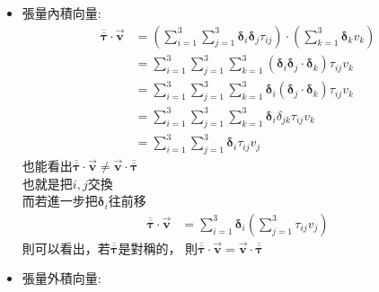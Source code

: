 \documentclass[../main.tex]{subfiles}
\begin{document}
\begin{itemize}
\begin{itemize}
\begin{align}
          \right)\sigma_{ij}\tau_{mn} \nonumber\\
          &= \sum_{i=1}^3 \sum_{j=1}^3 \sum_{m=1}^3 \sum_{n=1}^3 \delta_{jm}\delta_{in} \sigma_{ij}\tau_{mn} \nonumber\\
          &= \sum_{i=1}^3 \sum_{j=1}^3 \sigma_{ij}\tau_{ji}
        \end{align}
        P.S. 如果有一個是張量$\overline{\overline {\bm \tau}}$，另一個是兩個向量直積產生的張量$\vec {\bm v} \vec {\bm w}$，則
        \begin{equation}
          \overline{\overline {\bm \tau}} : \left(\vec {\bm v} \vec {\bm w}\right) = \sum_{i=1}^3 \sum_{j=1}^3 \tau_{ij} v_j w_i
        \end{equation}
      \item 張量內積向量:
        \begin{align}
          \overline{\overline {\bm \tau}} \cdot \vec {\bm v} &=
          \left(
            \sum_{i=1}^3 \sum_{j=1}^3 \bm \delta_i \bm \delta_j \tau_{ij}
          \right) \cdot
          \left(
            \sum_{k=1}^3 \bm \delta_k v_k
          \right) \nonumber\\
          &= \sum_{i=1}^3 \sum_{j=1}^3 \sum_{k=1}^3 \left(
            \bm \delta_i \bm \delta_j \cdot \bm \delta_k
          \right) \tau_{ij} v_k \nonumber\\
          &= \sum_{i=1}^3 \sum_{j=1}^3 \sum_{k=1}^3 \bm \delta_i (\bm \delta_j \cdot \bm \delta_k)  \tau_{ij} v_k \nonumber\\
          &= \sum_{i=1}^3 \sum_{j=1}^3 \sum_{k=1}^3 \bm \delta_i \delta_{jk}  \tau_{ij} v_k \nonumber\\
          &= \sum_{i=1}^3 \sum_{j=1}^3  \bm \delta_i  \tau_{ij} v_j 
        \end{align}
        也能看出$\overline{\overline {\bm \tau}} \cdot \vec {\bm v} \neq \vec {\bm v} \cdot \overline{\overline {\bm \tau}}$\\
        也就是把$i,j$交換\\
        而若進一步把$\bm\delta_i$往前移
        \begin{align}
          \overline{\overline {\bm \tau}} \cdot \vec {\bm v} &=
          \sum_{i=1}^3 \bm \delta_i \left(
            \sum_{j=1}^3  \tau_{ij} v_j 
          \right)
        \end{align}
        則可以看出，若$\overline{\overline {\bm \tau}}$是對稱的，
        則$\overline{\overline {\bm \tau}} \cdot \vec {\bm v} = \vec {\bm v} \cdot \overline{\overline {\bm \tau}}$
      \item 張量外積向量:

\end{itemize}
\end{itemize}
\end{document}

